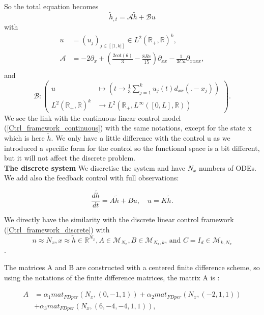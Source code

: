 \documentclass[12pt]{article}
\begin{document}
So the total equation becomes
\begin{equation*}
    \tilde{h}_{,t} = \mathcal{A}\tilde{h} + \mathcal{B} u
\end{equation*}
with
\begin{align*}
     u&=(u_j)_{j\in[|1,k|]}\in L^2(\mathbb{R}_+,\mathbb{R})^k, \\
     \mathcal{A}&= -2\partial_x + (\frac{2cot(\theta)}{3}-\frac{8Re}{15})\partial_{xx} - \frac{1}{3Ca}\partial_{xxxx},\\
\end{align*}
and 
\begin{equation*}
         \mathcal{B}: \left(
         \begin{aligned}
             u\ &\mapsto \left( t \rightarrow \frac{1}{3}\sum_{j=1}^ku_j(t)d_{xx}(.-x_j) \right) \\
             L^2(\mathbb{R}_+,\mathbb{R})^k &\rightarrow L^2(\mathbb{R}_+, L^{\infty}([0,L], \mathbb{R}))
         \end{aligned}
         \right).
\end{equation*}
We see the link with the continuous linear control model (\ref{Ctrl_framework_continuous}) with the same notations, except for the state x which is here $\tilde{h}$. We only have a little difference with the control u as we introduced a specific form for the control so the functional space is a bit different, but it will not affect the discrete problem. \\

 \textbf{The discrete system}
We discretise the system and have $N_x$ numbers of ODEs. We add also the feedback control with full observations: 

\begin{equation}\label{eq_discrete_ctrl_FLF}
\boxed{
\frac{d\tilde{h}}{dt} = A\tilde{h} + B u, \quad u = K\tilde{h}.}
 \end{equation}

We directly have the similarity with the discrete linear control framework (\ref{Ctrl_framework_discrete}) with $$n \approx N_x, x \approx \tilde{h} \in \mathbb{R}^{N_x}, A \in \mathcal{M}_{N_x}, B\in \mathcal{M}_{N_x, k} \text{, and }  C= I_d \in \mathcal{M}_{k, N_x}$$.

The matrices A and B are constructed with a centered finite difference scheme, so using the notations of the finite difference matrices, the matrix A is : 

\begin{equation}
\boxed{
\begin{aligned}
    A &= \alpha_1 mat_{FDper}(N_x, (0, -1, 1))+\alpha_2 mat_{FDper}(N_x, (-2, 1, 1))\\
    &+ \alpha_3 mat_{FDper}(N_x, (6, -4, -4, 1, 1)), \\
\end{aligned}
}
\end{equation}
\end{document}
